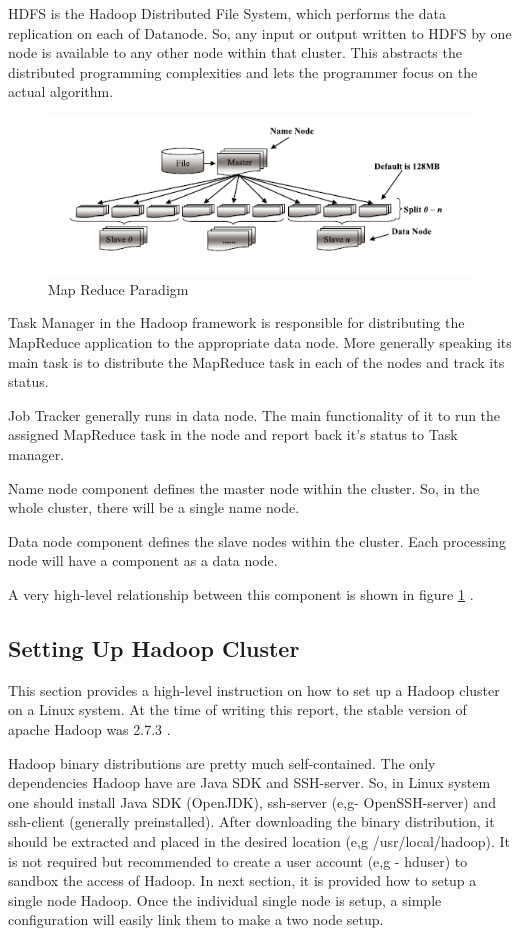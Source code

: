\documentclass{article}
\begin{document}
HDFS is the Hadoop Distributed File System, which performs the data replication on each of Datanode. So, any input or output written to HDFS by one node is available to any other node within that cluster. This abstracts the distributed programming complexities and lets the programmer focus on the actual algorithm.

\begin{figure}[h]
	\centering
	\includegraphics[width=\textwidth]{hadoop-hdfs}
	\caption{Map Reduce Paradigm}
	\label{fig:hdfs}
\end{figure}

Task Manager in the Hadoop framework is responsible for distributing the MapReduce application to the appropriate data node. More generally speaking its main task is to distribute the MapReduce task in each of the nodes and track its status.

Job Tracker generally runs in data node. The main functionality of it to run the assigned MapReduce task in the node and report back it’s status to Task manager.

Name node component defines the master node within the cluster. So, in the whole cluster, there will be a single name node.

Data node component defines the slave nodes within the cluster. Each processing node will have a component as a data node.

A very high-level relationship between this component is shown in figure \ref{fig:hdfs} \cite{c452017}.

\subsection{Setting Up Hadoop Cluster}
This section provides a high-level instruction on how to set up a Hadoop cluster on a Linux system. At the time of writing this report, the stable version of apache Hadoop was 2.7.3 \cite{hadoopap}.

Hadoop binary distributions are pretty much self-contained. The only dependencies Hadoop have are Java SDK and SSH-server. So, in Linux system one should install Java SDK (OpenJDK), ssh-server (e,g- OpenSSH-server) and ssh-client (generally preinstalled). After downloading the binary distribution, it should be extracted and placed in the desired location (e,g /usr/local/hadoop). It is not required but recommended to create a user account (e,g - hduser) to sandbox the access of Hadoop. In next section, it is provided how to setup a single node Hadoop. Once the individual single node is setup, a simple configuration will easily link them to make a two node setup.
\end{document}
